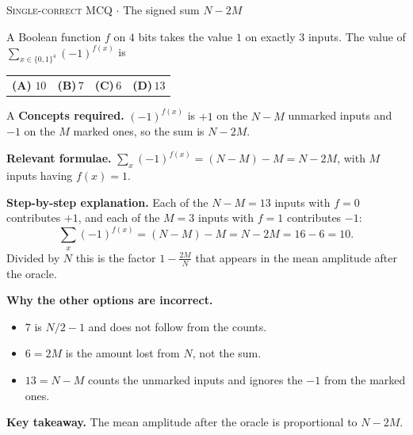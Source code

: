 \documentclass[11pt,a4paper]{article}
\newcommand{\optlabel}[1]{\textbf{(#1)}}
\newcommand{\correctlabel}[1]{\textcolor{okgreen}{\textbf{(#1)}\,\ding{51}}}
\newenvironment{qitem}[1]{\begin{list}{}{\setlength{\leftmargin}{3.3em}\setlength{\labelwidth}{3.1em}%
  \setlength{\labelsep}{0.2em}\setlength{\topsep}{3pt}\setlength{\parsep}{3pt}}\item[\textbf{Q.#1}\hfill]}{\end{list}}
\newcommand{\qsep}{\par\vspace{2pt}{\color{black!15}\hrule}\vspace{4pt}}
\newcommand{\qmeta}[2]{{\footnotesize\color{black!60}\textsc{#1} \;$\cdot$\; #2}\par}
\begin{document}
\begin{qitem}{11}
\qmeta{Single-correct MCQ}{The signed sum $N - 2M$}
A Boolean function $f$ on $4$ bits takes the value $1$ on exactly $3$ inputs. The value of $\displaystyle\sum_{x\in\{0,1\}^4}(-1)^{f(x)}$ is
\par\smallskip\noindent\begin{tabularx}{\linewidth}{@{}*{4}{L}@{}}
\correctlabel{A}\,$10$ & \optlabel{B}\,$7$ & \optlabel{C}\,$6$ & \optlabel{D}\,$13$
\end{tabularx}
\end{qitem}
\begin{solbox}{A}
\textbf{\color{brand}Concepts required.} $(-1)^{f(x)}$ is $+1$ on the $N - M$ unmarked inputs and $-1$ on the $M$ marked ones, so the sum is $N - 2M$.

\textbf{\color{brand}Relevant formulae.} $\sum_x(-1)^{f(x)} = (N - M) - M = N - 2M$, with $M$ inputs having $f(x) = 1$.

\textbf{\color{brand}Step-by-step explanation.} Each of the $N - M = 13$ inputs with $f = 0$ contributes $+1$, and each of the $M = 3$ inputs with $f = 1$ contributes $-1$:
\[ \sum_x (-1)^{f(x)} = (N - M) - M = N - 2M = 16 - 6 = 10. \]
Divided by $N$ this is the factor $1 - \frac{2M}{N}$ that appears in the mean amplitude after the oracle.

\textbf{\color{brand}Why the other options are incorrect.}
\begin{itemize}[leftmargin=2.4em, itemsep=1pt, topsep=2pt]
\item[\textbf{(B)}] $7$ is $N/2 - 1$ and does not follow from the counts.
\item[\textbf{(C)}] $6 = 2M$ is the amount lost from $N$, not the sum.
\item[\textbf{(D)}] $13 = N - M$ counts the unmarked inputs and ignores the $-1$ from the marked ones.
\end{itemize}
\textbf{\color{brand}Key takeaway.} The mean amplitude after the oracle is proportional to $N - 2M$.
\end{solbox}
\qsep
\end{document}
